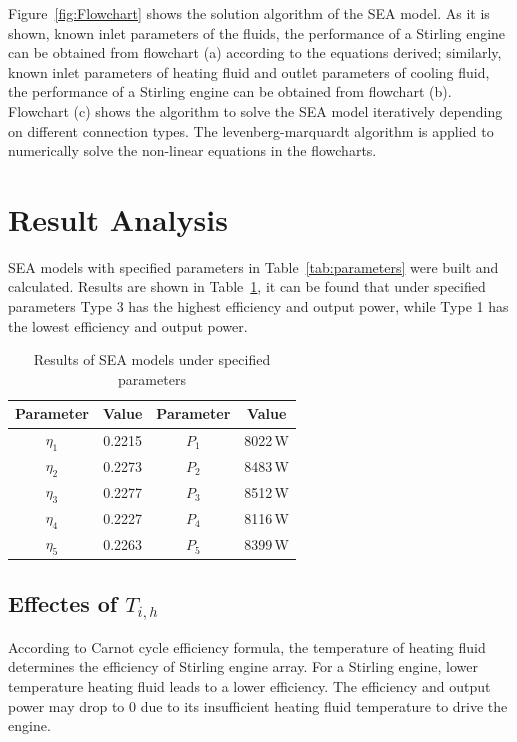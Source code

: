 Figure~\ref{fig:Flowchart} shows the solution algorithm of the SEA model. As it is shown, known inlet parameters of the fluids, the performance of a Stirling engine can be obtained from flowchart (a) according to the equations derived; similarly, known inlet parameters of heating fluid and outlet parameters of cooling fluid, the performance of a Stirling engine can be obtained from flowchart (b). Flowchart (c) shows the algorithm to solve the SEA model iteratively depending on different connection types. The levenberg-marquardt algorithm is applied to numerically solve the non-linear equations in the flowcharts.

\section{Result Analysis}

SEA models with specified parameters in Table~\ref{tab:parameters} were built and calculated. Results are shown in Table~\ref{tab:result}, it can be found that under specified parameters Type 3 has the highest efficiency and output power, while Type 1 has the lowest efficiency and output power.

\begin{table}[htbp]
	\caption{Results of SEA models under specified parameters}
	\begin{center}
	\begin{tabular}{cccc}
		\toprule
		Parameter		&	Value	&	Parameter		&	Value\\
		\midrule
		$\eta_1$	&	0.2215	&	$P_1$		&	8022\,W\\
		$\eta_2$	&	0.2273	&	$P_2$		&	8483\,W\\
		$\eta_3$	&	0.2277	&	$P_3$		&	8512\,W\\
		$\eta_4$	&	0.2227	&	$P_4$		&	8116\,W\\
		$\eta_5$	&	0.2263	&	$P_5$		&	8399\,W\\
		\bottomrule
	\end{tabular}
	\end{center}
	\label{tab:result}
\end{table}

\subsection{Effectes of $T_{i,h}$}
According to Carnot cycle efficiency formula, the temperature of heating fluid determines the efficiency of Stirling engine array. For a Stirling engine, lower temperature heating fluid leads to a lower efficiency. The efficiency and output power may drop to 0 due to its insufficient heating fluid temperature to drive the engine.


